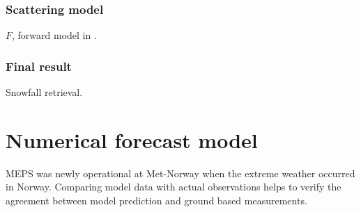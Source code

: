 \subsection*{Scattering model}
$F$, forward model in .
\subsection*{Final result}
Snowfall retrieval.

\chapter{Numerical forecast model}
MEPS was newly operational at Met-Norway when the extreme weather occurred in Norway. Comparing model data with actual observations helps to verify the agreement between model prediction and ground based measurements. 


